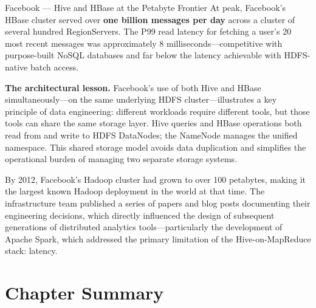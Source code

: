 \begin{casestudy}{Facebook --- Hive and HBase at the Petabyte Frontier}
At peak, Facebook's HBase cluster served over \textbf{one billion
messages per day} across a cluster of several hundred RegionServers.
The P99 read latency for fetching a user's 20 most recent messages
was approximately 8 milliseconds---competitive with purpose-built
NoSQL databases and far below the latency achievable with
HDFS-native batch access.

\smallskip
\textbf{The architectural lesson.}
Facebook's use of both Hive and HBase simultaneously---on the same
underlying HDFS cluster---illustrates a key principle of data
engineering: different workloads require different tools, but those
tools can share the same storage layer. Hive queries and HBase
operations both read from and write to HDFS DataNodes; the
NameNode manages the unified namespace. This shared storage model
avoids data duplication and simplifies the operational burden of
managing two separate storage systems.

By 2012, Facebook's Hadoop cluster had grown to over 100 petabytes,
making it the largest known Hadoop deployment in the world at that
time. The infrastructure team published a series of papers and blog
posts documenting their engineering decisions, which directly
influenced the design of subsequent generations of distributed
analytics tools---particularly the development of Apache Spark, which
addressed the primary limitation of the Hive-on-MapReduce stack:
latency.
\end{casestudy}

\section*{Chapter Summary}
\label{sec:ch4-summary}


